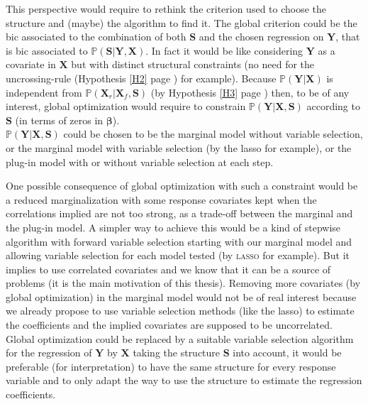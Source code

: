 \documentclass[12pt,a4paper]{report}
\begin{document}
			 This perspective would require to rethink the criterion used to choose the structure and (maybe) the algorithm to find it. The global criterion could be the {\sc bic} associated to the combination of both $\boldsymbol{S}$ and the chosen regression on $\boldsymbol{Y}$, that is {\sc bic} associated to $\mathbb{P}(\boldsymbol{S}|\boldsymbol{Y},\boldsymbol{X})$. In fact it would be like considering $\boldsymbol{Y}$ as a covariate in $\boldsymbol{X}$ but with distinct structural constraints (no need for the uncrossing-rule (Hypothesis \ref{H2} page \pageref{H2}) for example).  %
			 Because $\mathbb{P}(\boldsymbol{Y}|\boldsymbol{X})$ is independent from $\mathbb{P}(\boldsymbol{X}_r|\boldsymbol{X}_f,\boldsymbol{S})$ (by Hypothesis \ref{H3} page \pageref{H3})
			then, to be of any interest, global optimization would require to constrain $\mathbb{P}(\boldsymbol{Y}|\boldsymbol{X},\boldsymbol{S})$ according to $\boldsymbol{S}$ (in terms of zeros in $\boldsymbol{\beta}$).\\
			$\mathbb{P}(\boldsymbol{Y}|\boldsymbol{X},\boldsymbol{S})$ could be chosen to be the marginal model without variable selection, or the marginal model with variable selection (by the {\sc lasso} for example), or the plug-in model with or without variable selection at each step.
			
			  One possible consequence of global optimization with such a constraint would be a reduced marginalization with some response covariates kept when the correlations implied are not too strong, as a trade-off between the marginal and the plug-in model. A simpler way to achieve this would be a kind of stepwise algorithm with forward variable selection starting with our marginal model and allowing variable selection for each model tested (by \textsc{lasso} for example). 
			  But it implies to use correlated covariates and we know that it can be a source of problems (it is the main motivation of this thesis).
			   Removing more covariates (by global optimization) in the marginal model would not be of real interest because we already propose to use variable selection methods (like the {\sc lasso}) to estimate the coefficients and the implied covariates are supposed to be uncorrelated. Global optimization could be replaced by a suitable variable selection algorithm for the regression of $\boldsymbol{Y}$ by $\boldsymbol{X}$ taking the structure $\boldsymbol{S}$ into account, it would be preferable (for interpretation) to have the same structure for every response variable and to only adapt the way to use the structure to estimate the regression coefficients. \\
							  
\end{document}
